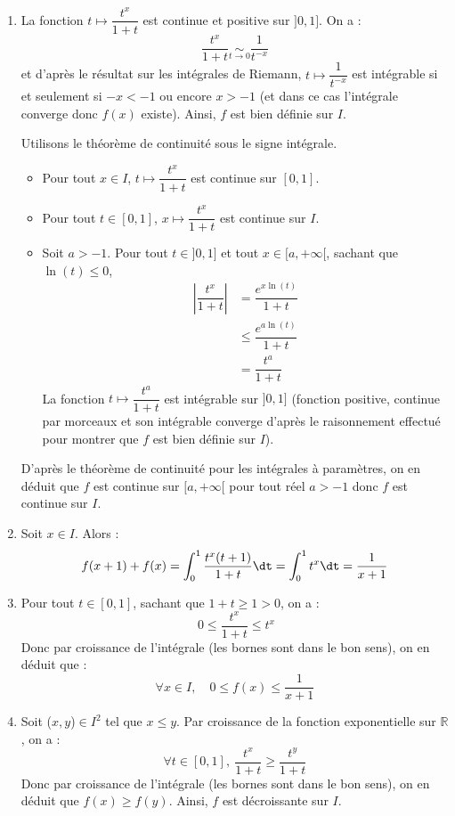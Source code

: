 \documentclass[a4paper,10pt]{report}
\begin{document}
	\begin{enumerate}
	\item La fonction $t\mapsto\dfrac{t^x}{1+t}$ est continue et positive sur $]0,1]$. On a :
	$$ \frac{t^{x}}{1+t} \underset{t \rightarrow 0}{\sim} \frac1{t^{-x}}$$
	et d'après le résultat sur les intégrales de Riemann, $t \mapsto \dfrac{1}{t^{-x}}$ est intégrable si et seulement si $-x<-1$ ou encore $x>-1$ (et dans ce cas l'intégrale converge donc $f(x)$ existe). Ainsi, $f$ est bien d\'efinie sur $I$.
	
	\medskip

\noindent Utilisons le théorème de continuité sous le signe intégrale.

\begin{itemize}
\item Pour tout $x \in I$, $t \mapsto \dfrac{t^x}{1+t}$ est continue sur $[0,1]$.
\item Pour tout $t \in [0,1]$, $x \mapsto  \dfrac{t^x}{1+t}$ est continue sur $I$.
\item Soit $a>-1$. Pour tout $t \in ]0,1]$ et tout $x \in [a, + \infty[$, sachant que $\ln(t) \leq 0$,
\begin{align*}
 \left\vert \dfrac{t^x}{1+t} \right\vert & = \dfrac{e^{x \ln(t)}}{1+t} \\
 & \leq \dfrac{e^{a \ln(t)}}{1+t} \\
 & = \dfrac{t^a}{1+t}
 \end{align*}
La fonction $t \mapsto \dfrac{t^a}{1+t}$ est intégrable sur $]0,1]$ (fonction positive, continue par morceaux et son intégrable converge d'après le raisonnement effectué pour montrer que $f$ est bien définie sur $I$).
\end{itemize}
D'après le théorème de continuité pour les intégrales à paramètres, on en déduit que $f$ est continue sur $[a, + \infty[$ pour tout réel $a>-1$ donc $f$ est continue sur $I$.


	\item Soit $x \in I$.  Alors :
$$f(x+1)+f(x)=\int_0^1 \frac{t^x(t+1)}{1+t} \dt =\int_0^1t^x \dt=\frac1{x+1}$$

	\item Pour tout $t\in[0,1]$, sachant que $1+t \geq 1>0$, on a :
	$$ \ 0\le \frac{t^x}{1+t} \le t^x$$
Donc par croissance de l'intégrale (les bornes sont dans le bon sens), on en déduit que : 
$$ \forall x\in I,\quad 0\le f(x) \le \frac1{x+1}$$

	\item Soit ($x,y$)$\in I^2$ tel que $x\le y$. Par croissance de la fonction exponentielle sur $\mathbb{R}$, on a :
$$\forall t\in[0,1], \ \frac{t^x}{1+t} \ge \frac{t^y}{1+t}$$
Donc par croissance de l'intégrale (les bornes sont dans le bon sens), on en déduit que $f(x)\ge f(y)$. Ainsi, $f$ est d\'ecroissante sur $I$.


\end{enumerate}
\end{document}

